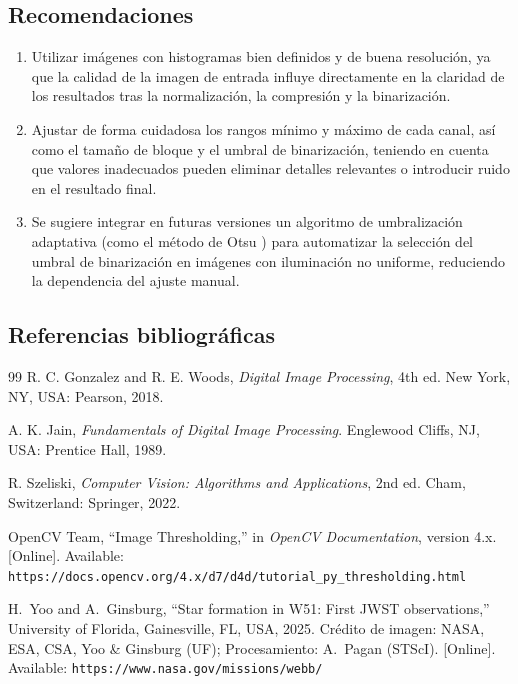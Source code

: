 \documentclass[11pt]{article}
\begin{document}
\subsection{Recomendaciones}
\begin{enumerate}
    \item Utilizar imágenes con histogramas bien definidos y de buena resolución, ya que la calidad de la imagen de entrada influye directamente en la claridad de los resultados tras la normalización, la compresión y la binarización.

    \item Ajustar de forma cuidadosa los rangos mínimo y máximo de cada canal, así como el tamaño de bloque y el umbral de binarización, teniendo en cuenta que valores inadecuados pueden eliminar detalles relevantes o introducir ruido en el resultado final.

    \item Se sugiere integrar en futuras versiones un algoritmo de umbralización adaptativa (como el método de Otsu \cite{opencv_doc}) para automatizar la selección del umbral de binarización en imágenes con iluminación no uniforme, reduciendo la dependencia del ajuste manual.
\end{enumerate}

\subsection{Referencias bibliográficas}
{
    \renewcommand{\refname}{}
    \vspace{-1.5em}

    \begin{thebibliography}{99}
        R. C. Gonzalez and R. E. Woods, \textit{Digital Image Processing}, 4th ed. New York, NY, USA: Pearson, 2018.

        A. K. Jain, \textit{Fundamentals of Digital Image Processing}. Englewood Cliffs, NJ, USA: Prentice Hall, 1989.

        R. Szeliski, \textit{Computer Vision: Algorithms and Applications}, 2nd ed. Cham, Switzerland: Springer, 2022.

        OpenCV Team, ``Image Thresholding,'' in \textit{OpenCV Documentation}, version 4.x. [Online]. Available: \texttt{https://docs.opencv.org/4.x/d7/d4d/tutorial\_py\_thresholding.html}

        H.~Yoo and A.~Ginsburg, ``Star formation in W51: First JWST observations,'' University of Florida, Gainesville, FL, USA, 2025. Crédito de imagen: NASA, ESA, CSA, Yoo \& Ginsburg (UF); Procesamiento: A.~Pagan (STScI). [Online]. Available: \texttt{https://www.nasa.gov/missions/webb/}
    \end{thebibliography}
}
\end{document}
